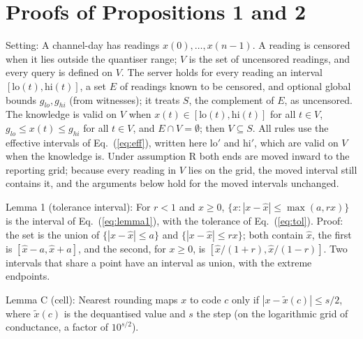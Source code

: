 \appendix
\sloppy
\renewcommand{\thetable}{\Alph{section}.\arabic{table}}

\section{Proofs of Propositions 1 and 2}
\label{app:proofs}
Setting: A channel-day has readings $x(0), \dots, x(n-1)$. A reading is censored when it lies outside the quantiser range; $V$ is the set of uncensored readings, and every query is defined on $V$. The server holds for every reading an interval $[\mathrm{lo}(t), \mathrm{hi}(t)]$, a set $E$ of readings known to be censored, and optional global bounds $g_{lo}, g_{hi}$ (from witnesses); it treats $S$, the complement of $E$, as uncensored. The knowledge is valid on $V$ when $x(t) \in [\mathrm{lo}(t), \mathrm{hi}(t)]$ for all $t \in V$, $g_{lo} \le x(t) \le g_{hi}$ for all $t \in V$, and $E \cap V = \emptyset$; then $V \subseteq S$. All rules use the effective intervals of Eq.~(\ref{eq:eff}), written here $\mathrm{lo}'$ and $\mathrm{hi}'$, which are valid on $V$ when the knowledge is. Under assumption R both ends are moved inward to the reporting grid; because every reading in $V$ lies on the grid, the moved interval still contains it, and the arguments below hold for the moved intervals unchanged.

Lemma 1 (tolerance interval): For $r < 1$ and $x \ge 0$, $\{x : |x - \hat{x}| \le \max(a, rx)\}$ is the interval of Eq.~(\ref{eq:lemma1}), with the tolerance of Eq.~(\ref{eq:tol}). Proof: the set is the union of $\{|x - \hat{x}| \le a\}$ and $\{|x - \hat{x}| \le rx\}$; both contain $\hat{x}$, the first is $[\hat{x} - a, \hat{x} + a]$, and the second, for $x \ge 0$, is $[\hat{x}/(1+r), \hat{x}/(1-r)]$. Two intervals that share a point have an interval as union, with the extreme endpoints.

Lemma C (cell): Nearest rounding maps $x$ to code $c$ only if $|x - \tilde{x}(c)| \le s/2$, where $\tilde{x}(c)$ is the dequantised value and $s$ the step (on the logarithmic grid of conductance, a factor of $10^{s/2}$).

